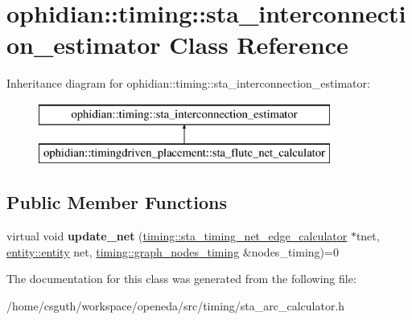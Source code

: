 \hypertarget{classophidian_1_1timing_1_1sta__interconnection__estimator}{\section{ophidian\-:\-:timing\-:\-:sta\-\_\-interconnection\-\_\-estimator Class Reference}
\label{classophidian_1_1timing_1_1sta__interconnection__estimator}
}
Inheritance diagram for ophidian\-:\-:timing\-:\-:sta\-\_\-interconnection\-\_\-estimator\-:\begin{figure}[H]
\begin{center}
\leavevmode
\includegraphics[height=2.000000cm]{classophidian_1_1timing_1_1sta__interconnection__estimator}
\end{center}
\end{figure}
\subsection*{Public Member Functions}
\begin{DoxyCompactItemize}
\item 
\hypertarget{classophidian_1_1timing_1_1sta__interconnection__estimator_abf3cff95c4f86857b96c390d09387b87}{virtual void {\bfseries update\-\_\-net} (\hyperlink{classophidian_1_1timing_1_1sta__timing__net__edge__calculator}{timing\-::sta\-\_\-timing\-\_\-net\-\_\-edge\-\_\-calculator} $\ast$tnet, \hyperlink{classophidian_1_1entity_1_1entity}{entity\-::entity} net, \hyperlink{classophidian_1_1timing_1_1graph__nodes__timing}{timing\-::graph\-\_\-nodes\-\_\-timing} \&nodes\-\_\-timing)=0}\label{classophidian_1_1timing_1_1sta__interconnection__estimator_abf3cff95c4f86857b96c390d09387b87}

\end{DoxyCompactItemize}


The documentation for this class was generated from the following file\-:\begin{DoxyCompactItemize}
\item 
/home/csguth/workspace/openeda/src/timing/sta\-\_\-arc\-\_\-calculator.\-h\end{DoxyCompactItemize}
